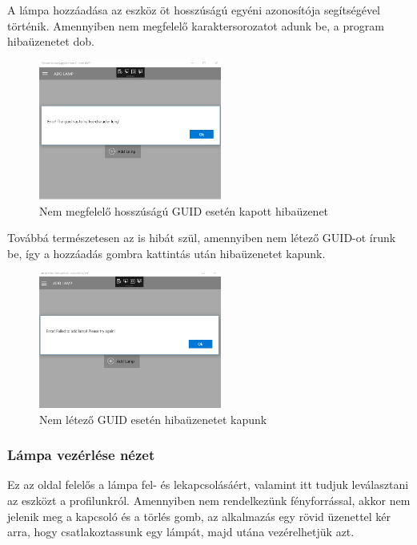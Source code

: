 \documentclass[a4paper,12pt]{report}
\begin{document}
    A lámpa hozzáadása az eszköz öt hosszúságú egyéni azonosítója segítségével történik. Amennyiben nem megfelelő karaktersorozatot
    adunk be, a program hibaüzenetet dob.

    \begin{figure}[H]
        \centering
        \includegraphics[width=6cm]{images/fivecharacter.jpg}
        \caption{Nem megfelelő hosszúságú GUID esetén kapott hibaüzenet}
        \label{fig: FiveCharacter}
    \end{figure}

    Továbbá természetesen az is hibát szül, amennyiben nem létező GUID-ot írunk be, így a hozzáadás gombra kattintás után
    hibaüzenetet kapunk.

    \begin{figure}[H]
        \centering
        \includegraphics[width=6cm]{images/addfail.jpg}
        \caption{Nem létező GUID esetén hibaüzenetet kapunk}
        \label{fig: InvalidGuid}
    \end{figure}

    \subsubsection{Lámpa vezérlése nézet}
    Ez az oldal felelős a lámpa fel- és lekapcsolásáért, valamint itt tudjuk leválasztani az eszközt a profilunkról. Amennyiben
    nem rendelkezünk fényforrással, akkor nem jelenik meg a kapcsoló és a törlés gomb, az alkalmazás egy rövid üzenettel kér
    arra, hogy csatlakoztassunk egy lámpát, majd utána vezérelhetjük azt.
\end{document}
